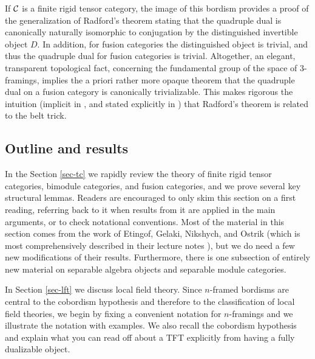 \documentclass{amsart}
\begin{document}
If $\mathcal C$ is a finite rigid tensor category, the image of this bordism provides a proof of the generalization of Radford's theorem \cite{MR0407069, MR2097289} stating that the quadruple dual is canonically naturally isomorphic to conjugation by the distinguished invertible object $D$.  In addition, for fusion categories the distinguished object is trivial, and thus the quadruple dual for fusion categories is trivial.  Altogether, an elegant, transparent topological fact, concerning the fundamental group of the space of $3$-framings, implies the a priori rather more opaque theorem that the quadruple dual on a fusion category is canonically trivializable. This makes rigorous the intuition (implicit in \cite{MR2559711}, and stated explicitly in \cite{0901.3975}) that Radford's theorem is related to the belt trick.    %


\subsection{Outline and results}

In the Section \ref{sec-tc} we rapidly review the theory of finite rigid tensor categories, bimodule categories, and fusion categories, and we prove several key structural lemmas.  Readers are encouraged to only skim this section on a first reading, referring back to it when results from it are applied in the main arguments, or to check notational conventions.  Most of the material in this section comes from the work of Etingof, Gelaki, Nikshych, and Ostrik (which is most comprehensively described in their lecture notes \cite{EGNO}), but we do need a few new modifications of their results.  Furthermore, there is one subsection of entirely new material on separable algebra objects and separable module categories.  

In Section \ref{sec-lft} we discuss local field theory.  Since $n$-framed bordisms are central to the cobordism hypothesis and therefore to the classification of local field theories, we begin by fixing a convenient notation for $n$-framings and we illustrate the notation with examples.  We also recall the cobordism hypothesis and explain what you can read off about a TFT explicitly from having a fully dualizable object.
\end{document}
